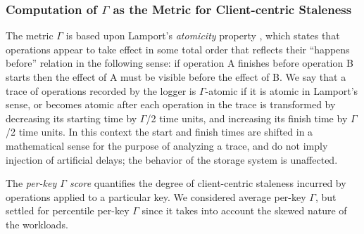 \documentclass[conference]{IEEEtran}
\begin{document}
\subsubsection{Computation of $\Gamma$ as the Metric for Client-centric Staleness}\label{sec:logstale}
   The metric $\Gamma$ is based upon Lamport's \emph{atomicity} property \cite{lamport_atomic}, which states that operations appear to
	take effect in some total order that reflects their ``happens before'' relation in the following sense:
	if operation A finishes before operation B starts then the effect of A must be visible before the effect of B.
We say that a trace of operations recorded by the logger is {\boldmath$\Gamma$}-atomic if it is atomic in Lamport's sense, or becomes atomic
after each operation in the trace is transformed by decreasing its starting time by {\boldmath$\Gamma$}/2 time units, and increasing
its finish time by {\boldmath$\Gamma$}/2 time units.
 In this context the start and finish times are shifted in a mathematical sense for the purpose of analyzing a trace, and do not imply injection of artificial delays;
the behavior of the storage system is unaffected.
\par The \emph{per-key $\Gamma$ score} quantifies the degree of client-centric staleness incurred by operations applied to a particular key. We considered average per-key  $\Gamma$, but settled for percentile per-key  $\Gamma$ since it takes into account the skewed nature of the workloads.  
\end{document}
